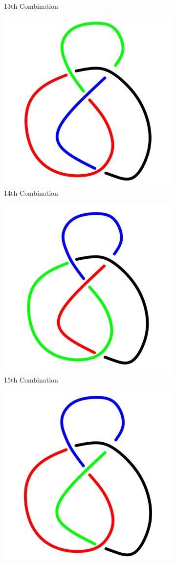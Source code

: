 \documentclass[a4paper,9pt]{article}
\begin{document}
\begin{enumerate}
\begin{figure}[h!]
\begin{subfigure}[b]{0.25\linewidth}
	\caption{13th Combination}
\end{subfigure}
\qquad
\begin{subfigure}[b]{0.25\linewidth}
	\centering
	\includegraphics[width=0.5\linewidth]{picture/knotpict/knot-14}
	\caption{14th Combination}
\end{subfigure}
\qquad
\begin{subfigure}[b]{0.25\linewidth}
	\centering
	\includegraphics[width=0.5\linewidth]{picture/knotpict/knot-15}
	\caption{15th Combination}
\end{subfigure}
\qquad
\begin{subfigure}[b]{0.25\linewidth}
	\centering
	\includegraphics[width=0.5\linewidth]{picture/knotpict/knot-16}

\end{subfigure}
\end{figure}
\end{enumerate}
\end{document}
